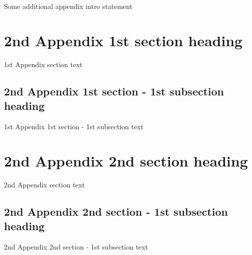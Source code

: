 Some additional appendix intro statement

\section[2nd Appendix 1st section ToC title]{2nd Appendix 1st section heading}

1st Appendix section text

\subsection[2nd Appendix 1st section - 1st subsection ToC title]{2nd Appendix 1st section - 1st subsection heading}

1st Appendix 1st section - 1st subsection text

\section[2nd Appendix 2nd section ToC title]{2nd Appendix 2nd section heading}

2nd Appendix section text

\subsection[2nd Appendix 2nd section - 1st subsection ToC title]{2nd Appendix 2nd section - 1st subsection heading}

2nd Appendix 2nd section - 1st subsection text

